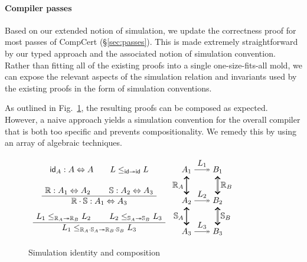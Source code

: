 \documentclass[sigplan,10pt,review,anonymous]{acmart}
\newcommand{\kw}[1]{\ensuremath{ \mathsf{#1} }}
\begin{document}

\paragraph{Compiler passes} %

Based on our extended notion of simulation,
we update the correctness proof for
most passes of CompCert (\S\ref{sec:passes}).
This is made extremely straightforward by
our typed approach and the associated notion of simulation convention.
Rather than fitting all of the existing proofs into a single
one-size-fits-all mold,
we can expose the relevant aspects of
the simulation relation and invariants used by the existing proofs
in the form of simulation conventions.

As outlined in Fig.~\ref{fig:simcomp},
the resulting proofs can be composed as expected.
However,
a naive approach yields a simulation convention
for the overall compiler
that is both too specific and prevents compositionality.
We remedy this by using an array of algebraic techniques.


\begin{figure} %
  $\begin{array}{c}
    \kw{id}_A : A \Leftrightarrow A
    \qquad
    L \le_{\kw{id} \twoheadrightarrow \kw{id}} L
    \\[1.5em]
    \AxiomC{$\mathbb{R} : A_1 \Leftrightarrow A_2$}
    \AxiomC{$\mathbb{S} : A_2 \Leftrightarrow A_3$}
    \BinaryInfC{$\mathbb{R} \cdot \mathbb{S} : A_1 \Leftrightarrow A_3$}
    \DisplayProof
    \\[1.5em]
    \AxiomC{$L_1 \le_{\mathbb{R}_A \twoheadrightarrow \mathbb{R}_B} L_2$}
    \AxiomC{$L_2 \le_{\mathbb{S}_A \twoheadrightarrow \mathbb{S}_B} L_3$}
    \BinaryInfC{$
      L_1 \le_{\mathbb{R}_A \cdot \mathbb{S}_A \twoheadrightarrow
               \mathbb{R}_B \cdot \mathbb{S}_B} L_3$}
    \DisplayProof
  \end{array}
  \begin{tikzpicture}[baseline,scale=0.66]
    \node (A1) at (-1,  2) {$A_1$};
    \node (A2) at (-1,  0) {$A_2$};
    \node (A3) at (-1, -2) {$A_3$};
    \node (B1) at ( 1,  2) {$B_1$};
    \node (B2) at ( 1,  0) {$B_2$};
    \node (B3) at ( 1, -2) {$B_3$};
    \draw (A1) edge[->>] node[auto] {$L_1$} (B1);
    \draw (A2) edge[->>] node[auto] {$L_2$} (B2);
    \draw (A3) edge[->>] node[auto] {$L_3$} (B3);
    \draw (A1) edge[<->, double] node[auto,swap] {$\mathbb{R}_A$} (A2);
    \draw (B1) edge[<->, double] node[auto] {$\mathbb{R}_B$} (B2);
    \draw (A2) edge[<->, double] node[auto,swap] {$\mathbb{S}_A$} (A3);
    \draw (B2) edge[<->, double] node[auto] {$\mathbb{S}_B$} (B3);
  \end{tikzpicture}
  $
  \caption{Simulation identity and composition}
  \label{fig:simcomp}
\end{figure}
\end{document}
